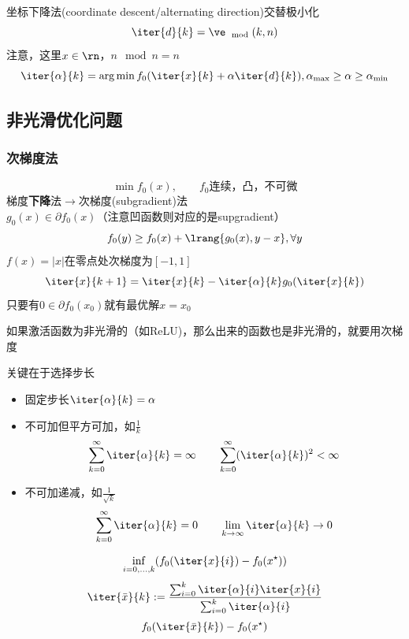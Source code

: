 坐标下降法(coordinate descent/alternating direction)交替极小化
\[\iter{d}{k}=\ve_{\mod{}{}}(k,n)\]
注意，这里$x\in\rn$，$n \mod n = n$
\[\iter{\alpha}{k}=\arg\min f_0(\iter{x}{k}+\alpha\iter{d}{k}),\alpha_{\max}\geq \alpha\geq \alpha_{\min}\]

\subsection{非光滑优化问题}
\subsubsection{次梯度法}
\[\min f_0(x),\qquad f_0\text{连续，凸，不可微}\]
梯度\textbf{下降}法$\to$次梯度(subgradient)法\\
$g_0(x)\in\partial f_0(x)$（注意凹函数则对应的是supgradient）
\[f_0(y)\geq f_0(x)+\lrang{g_0(x),y-x},\forall y\]
$f(x)=|x|$在零点处次梯度为$[-1,1]$
\[\iter{x}{k+1}=\iter{x}{k}-\iter{\alpha}{k}g_0(\iter{x}{k})\]
只要有$0\in\partial f_0(x_0)$就有最优解$x=x_0$

如果激活函数为非光滑的（如ReLU)，那么出来的函数也是非光滑的，就要用次梯度

关键在于选择步长
\begin{itemize}
    \item 固定步长$\iter{\alpha}{k}=\alpha$
    \item 不可加但平方可加，如$\frac{1}{k}$
    \[\sum_{k=0}^\infty \iter{\alpha}{k}=\infty\qquad\sum_{k=0}^\infty(\iter{\alpha}{k})^2<\infty\]
    \item 不可加递减，如$\frac{1}{\sqrt{k}}$
    \[\sum_{k=0}^\infty\iter{\alpha}{k}=0\qquad\lim_{k\to\infty}\iter{\alpha}{k}\to 0\]
\end{itemize}

\[\inf_{i=0,\ldots,k}(f_0(\iter{x}{i})-f_0(x^\star))\]
\[\iter{\bar{x}}{k}:=\frac{\sum_{i=0}^k\iter{\alpha}{i}\iter{x}{i}}{\sum_{i=0}^k\iter{\alpha}{i}}\]
\[f_0(\iter{\bar{x}}{k})-f_0(x^\star)\]

